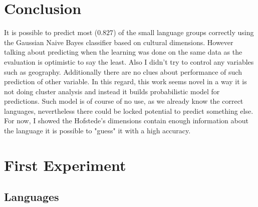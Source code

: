\documentclass[a4paper,10pt]{article}
\begin{document}
\section{Conclusion}

It is possible to predict most ($0.827$) of the small language groups correctly using the Gaussian Naive Bayes classifier based on cultural dimensions.
However talking about predicting when the learning was done on the same data as the evaluation is optimistic to say the least.
Also I didn't try to control any variables such as geography.
Additionally there are no clues about performance of such prediction of other variable.
In this regard, this work seems novel in a way it is not doing cluster analysis and instead it builds probabilistic model for predictions.
Such model is of course of no use, as we already know the correct languages, nevertheless there could be locked potential to predict something else.
For now, I showed the Hofstede's dimensions contain enough information about the language it is possible to "guess" it with a high accuracy.




\appendix

\section{First Experiment}

\subsection{Languages}
\end{document}
